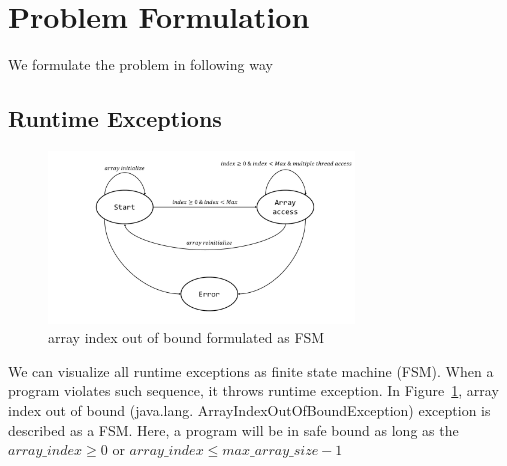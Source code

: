 
\section{Problem Formulation}
\label{sec:form}


We formulate the problem in following way

\subsection{Runtime Exceptions}
\label{subsec:excep}

\begin{figure}[t]
\centering
\includegraphics[width=3.2in]{images/ArrayIndex.pdf}
\caption{array index out of bound formulated as FSM}
\label{fig:array}
\end{figure}


We can visualize all runtime exceptions as finite state machine (FSM). When a
program violates such sequence, it throws runtime exception. 
In Figure~\ref{fig:array}, array index out of bound (java.lang.
ArrayIndexOutOfBoundException) exception is described as a FSM. 
Here, a program will be in safe bound as long as the $array\_index \geq 0$ or
$array\_index \leq max\_array\_size - 1$


